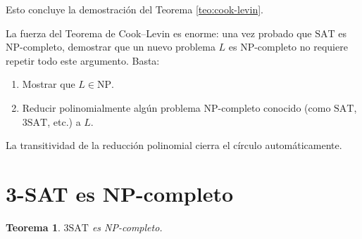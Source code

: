 \documentclass[11pt,a4paper]{article}
\theoremstyle{definicion}
\newtheorem{teorema}[definicion]{Teorema}
\newcommand{\NP}{\mathrm{NP}}
\begin{document}
Esto concluye la demostración del Teorema \ref{teo:cook-levin}.

\begin{idea}
La fuerza del Teorema de Cook--Levin es enorme: una vez probado que $\mathrm{SAT}$ es NP-completo, demostrar que un nuevo problema $L$ es NP-completo no requiere repetir todo este argumento. Basta:
\begin{enumerate}
    \item Mostrar que $L \in \NP$.
    \item Reducir polinomialmente algún problema NP-completo conocido (como $\mathrm{SAT}$, $3\mathrm{SAT}$, etc.) a $L$.
\end{enumerate}
La transitividad de la reducción polinomial cierra el círculo automáticamente.
\end{idea}

\section{3-SAT es NP-completo}

\begin{teorema}
$3\mathrm{SAT}$ es NP-completo.
\end{teorema}
\end{document}
